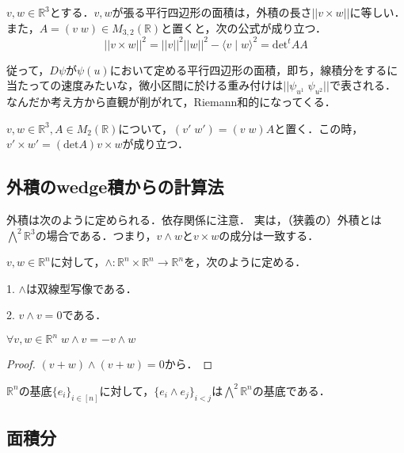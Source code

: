\documentclass[uplatex, dvipdfmx]{jsreport}
\begin{document}
\begin{proposition}
    $v,w\in\mathbb{R}^3$とする．$v,w$が張る平行四辺形の面積は，外積の長さ$||v\times w||$に等しい．また，$A=(v\; w)\in M_{3,2}(\mathbb{R})$と置くと，次の公式が成り立つ．
    \[ ||v\times w||^2 = ||v||^2||w||^2 - \langle v\mid w\rangle^2 = \mathrm{det}{}^tAA \]
\end{proposition}
\begin{remark*}
    従って，$D\psi$が$\psi(u)$において定める平行四辺形の面積，即ち，線積分をするに当たっての速度みたいな，微小区間に於ける重み付けは$||\psi_{u^1}\;\psi_{u^2}||$で表される．
    なんだか考え方から直観が削がれて，Riemann和的になってくる．
\end{remark*}

\begin{proposition}\label{prop-cross-product-for-change-of-basis}
    $v,w\in\mathbb{R}^3, A\in M_{2}(\mathbb{R})$について，$(v'\;w')=(v\; w)A$と置く．この時，$v'\times w'=(\mathrm{det}A)v\times w$が成り立つ．
\end{proposition}

\subsection{外積のwedge積からの計算法}
外積は次のように定められる．依存関係に注意．
実は，（狭義の）外積とは$\bigwedge^2\mathbb{R}^3$の場合である．つまり，$v\wedge w$と$v\times w$の成分は一致する．

\begin{definition}
    $v,w\in\mathbb{R}^n$に対して，$\wedge:\mathbb{R}^n\times\mathbb{R}^n\to\mathbb{R}^n$を，次のように定める．

    1. $\wedge$は双線型写像である．

    2. $v\wedge v=0$である．
\end{definition}

\begin{lemma}
    $\forall v,w\in\mathbb{R}^n\; w\wedge v=-v\wedge w$
\end{lemma}
\begin{proof}
    $(v+w)\wedge (v+w)=0$から．
\end{proof}

\begin{lemma}
    $\mathbb{R}^n$の基底$\{e_i\}_{i\in [n]}$に対して，$\{e_i\wedge e_j\}_{i<j}$は$\bigwedge^2\mathbb{R}^n$の基底である．
\end{lemma}

\subsection{面積分}
\end{document}
